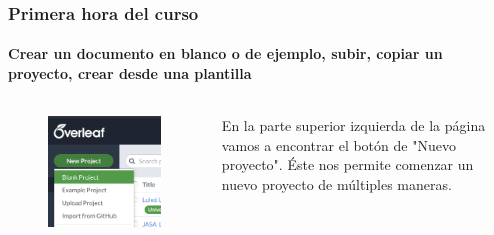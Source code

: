 \documentclass[aspectratio=169]{beamer}
\begin{document}
\begin{frame}
\frametitle{Primera hora del curso}
\framesubtitle{Crear un documento en blanco o de ejemplo, subir, copiar un proyecto, crear desde una plantilla}

\begin{columns}
	\begin{column}{0.48\textwidth}
		\begin{figure}
    \includegraphics[scale=0.5, left ]{imagens/createblank.png}
    \label{fig:Creando un documento en blanco}
\end{figure}
	\end{column}
	\begin{column}{0.48\textwidth}
		En la parte superior izquierda de la página vamos a encontrar el botón de "Nuevo proyecto". Éste nos permite comenzar un nuevo proyecto de múltiples maneras.
	\end{column}
\end{columns}
 

\end{frame}
\end{document}
